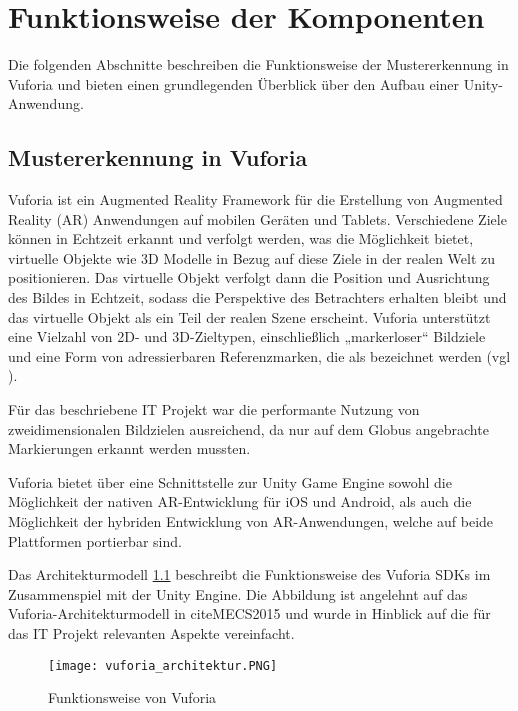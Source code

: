 \chapter{Funktionsweise der Komponenten}\label{ch:funktionsweise_der_komponenten}
Die folgenden Abschnitte beschreiben die Funktionsweise der Mustererkennung in Vuforia und bieten einen grundlegenden Überblick über den Aufbau einer Unity-Anwendung.
\section{Mustererkennung in Vuforia}\label{mustererkennung_vuforia}
Vuforia ist ein Augmented Reality Framework für die Erstellung von Augmented Reality (AR) Anwendungen auf mobilen Geräten und Tablets.
Verschiedene Ziele können in Echtzeit erkannt und verfolgt werden, was die Möglichkeit bietet, virtuelle Objekte wie 3D Modelle in Bezug auf diese Ziele in der realen Welt zu positionieren.
Das virtuelle Objekt verfolgt dann die Position und Ausrichtung des Bildes in Echtzeit, sodass die Perspektive des Betrachters erhalten bleibt und das virtuelle Objekt als ein Teil der realen Szene erscheint.
Vuforia unterstützt eine Vielzahl von 2D- und 3D-Zieltypen, einschließlich „markerloser“ Bildziele und eine Form von adressierbaren Referenzmarken, die als  bezeichnet werden (vgl \cite{Vuforia2018}). 

Für das beschriebene IT Projekt war die performante Nutzung von zweidimensionalen Bildzielen ausreichend, da nur auf dem Globus angebrachte Markierungen erkannt werden mussten.

Vuforia bietet über eine Schnittstelle zur Unity Game Engine sowohl die Möglichkeit der nativen AR-Entwicklung für iOS und Android, als auch die Möglichkeit der hybriden Entwicklung von AR-Anwendungen, welche auf beide Plattformen portierbar sind.

Das Architekturmodell \ref{fig:vuforia_architektur} beschreibt die Funktionsweise des Vuforia SDKs im Zusammenspiel mit der Unity Engine. Die Abbildung ist angelehnt auf das Vuforia-Architekturmodell in cite{MECS2015} und wurde in Hinblick auf die für das IT Projekt relevanten Aspekte vereinfacht.

\begin{figure} [h]
\centering
\texttt{[image: vuforia\_architektur.PNG]}
\caption{Funktionsweise von Vuforia}
\label{fig:vuforia_architektur}
\end{figure}
 

